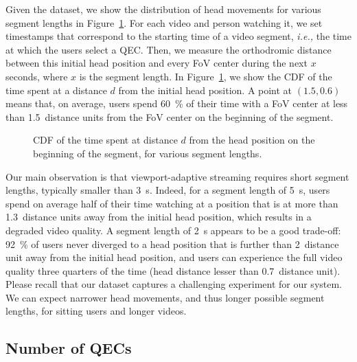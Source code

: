 Given the dataset, we show the distribution of head movements for
various segment lengths in Figure~\ref{cdf-dataset}. For each video
and person watching it, we set timestamps that correspond to the
starting time of a video segment, \textit{i.e.,} the time at which the
users select a \ac{QEC}. Then, we measure the orthodromic distance
between this initial head position and every \ac{FoV} center during
the next $x$ seconds, where $x$ is the segment length. In
Figure~\ref{cdf-dataset}, we show the \ac{CDF} of the time spent at a
distance $d$ from the initial head position.
A point at $(1.5,0.6)$
means that, on average, users spend \SI{60}{\percent} of their time
with a \ac{FoV} center at less than \num{1.5}~distance units from the
\ac{FoV} center on the beginning of the segment.

\begin{figure}
\centering

\caption{CDF of the time spent at distance $d$ from the head position on the beginning of the
segment, for various segment lengths.}\label{cdf-dataset}
\end{figure}

Our main observation is that viewport-adaptive streaming requires
short segment lengths, typically smaller than \SI{3}{\second}. Indeed,
for a segment length of \SI{5}{\second}, users spend on average half of
their time watching at a position that is at more than
\num{1.3}~distance units away from the initial head position, which
results in a degraded video quality. A segment length of
\SI{2}{\second} appears to be a good trade-off: \SI{92}{\percent} of
users never diverged to a head position that is further than
\num{2}~distance unit away from the initial head position, and users
can experience the full video quality three quarters of the time (head distance
lesser than \num{0.7}~distance unit). Please recall that our dataset
captures a challenging experiment for our system. We can expect
narrower head movements, and thus longer possible segment lengths, for
sitting users and longer videos.


\subsection{Number of \acp{QEC}}

